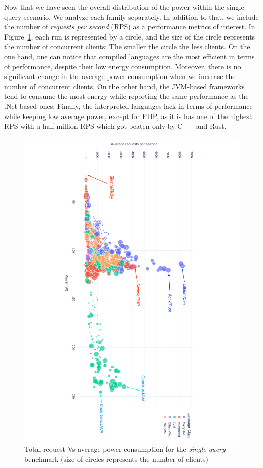 Now that we have seen the overall distribution of the power within the single query scenario.
We analyze each family separately.
In addition to that, we include the number of \emph{requests per second} (RPS) as a performance metrics of interest.
In Figure~\ref{fig:power_requests_db}, each run is represented by a circle, and the size of the circle represents the number of concurrent clients: The smaller the circle the less clients.
On the one hand, one can notice that compiled languages are the most efficient in terms of performance, despite their low energy consumption.
Moreover, there is no significant change in the average power consumption when we increase the number of concurrent clients.
On the other hand, the JVM-based frameworks tend to consume the most energy while reporting the same performance as the .Net-based ones.
Finally, the interpreted languages lack in terms of performance while keeping low average power, except for PHP, as it is has one of the highest RPS with a half million RPS which got beaten only by C++ and Rust.

\begin{figure}[hbt]
    \includegraphics[width=\columnwidth,angle=90]{imgs/power_requests_db}
    \caption{Total request Vs average power consumption for the \emph{single query} benchmark (size of circles represents the number of clients)}
    \label{fig:power_requests_db}
\end{figure}

